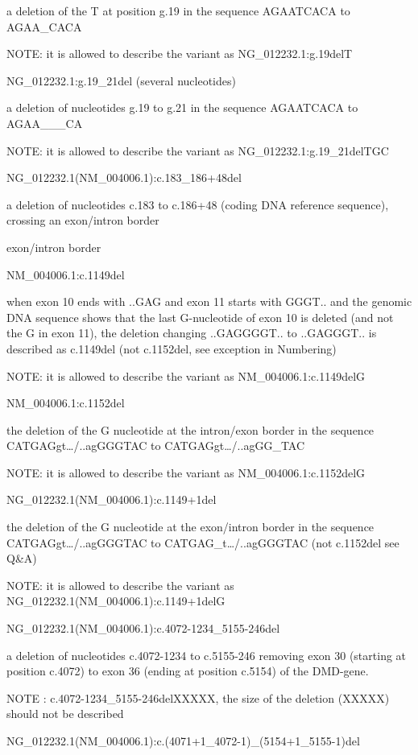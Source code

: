 \documentclass{book}
\begin{document}
	a deletion of the T at position g.19 in the sequence AGAATCACA to AGAA\_CACA

	NOTE: it is allowed to describe the variant as NG\_012232.1:g.19delT

	NG\_012232.1:g.19\_21del (several nucleotides)

	a deletion of nucleotides g.19 to g.21 in the sequence AGAATCACA to AGAA\_\_\_CA

	NOTE: it is allowed to describe the variant as NG\_012232.1:g.19\_21delTGC

	NG\_012232.1(NM\_004006.1):c.183\_186+48del

	a deletion of nucleotides c.183 to c.186+48 (coding DNA reference sequence), crossing an exon/intron border

	exon/intron border 

	NM\_004006.1:c.1149del

	when exon 10 ends with ..GAG and exon 11 starts with GGGT.. and the genomic DNA sequence shows that the last G-nucleotide of exon 10 is deleted (and not the G in exon 11), the deletion changing ..GAGGGGT.. to ..GAGGGT.. is described as c.1149del (not c.1152del, see exception in Numbering)

	NOTE: it is allowed to describe the variant as NM\_004006.1:c.1149delG

	NM\_004006.1:c.1152del

	the deletion of the G nucleotide at the intron/exon border in the sequence CATGAGgt…/..agGGGTAC to CATGAGgt…/..agGG\_TAC

	NOTE: it is allowed to describe the variant as NM\_004006.1:c.1152delG

	NG\_012232.1(NM\_004006.1):c.1149+1del

	the deletion of the G nucleotide at the exon/intron border in the sequence CATGAGgt…/..agGGGTAC to CATGAG\_t…/..agGGGTAC (not c.1152del see Q\&A)

	NOTE: it is allowed to describe the variant as NG\_012232.1(NM\_004006.1):c.1149+1delG

	NG\_012232.1(NM\_004006.1):c.4072-1234\_5155-246del

	a deletion of nucleotides c.4072-1234 to c.5155-246 removing exon 30 (starting at position c.4072) to exon 36 (ending at position c.5154) of the DMD-gene.

	NOTE : c.4072-1234\_5155-246delXXXXX, the size of the deletion (XXXXX) should not be described

	NG\_012232.1(NM\_004006.1):c.(4071+1\_4072-1)\_(5154+1\_5155-1)del
\end{document}
